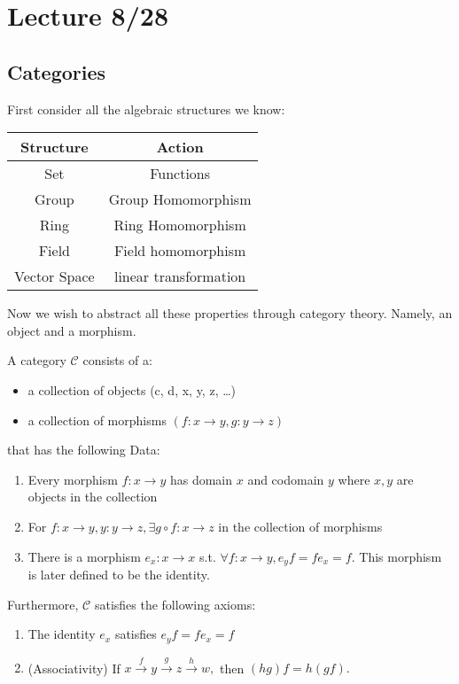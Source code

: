 \section{Lecture 8/28}
\subsection{Categories}
First consider all the algebraic structures we know:

\begin{center}
\begin{tabular}{c|c}
     Structure & Action \\\hline
     Set & Functions \\\hline
     Group & Group Homomorphism \\\hline
     Ring & Ring Homomorphism \\\hline
     Field & Field homomorphism \\\hline
     Vector Space & linear transformation \\
\end{tabular}
\end{center}

Now we wish to abstract all these properties through category theory. Namely, an object and a morphism. 

\begin{definition}
    A category $\mathcal{C}$ consists of a:
    \begin{itemize}
        \item a collection of objects (c, d, x, y, z, \dots)
        \item a collection of morphisms $(f: x\to y, g: y \to z) $
    \end{itemize}
    that has the following Data:
    \begin{enumerate} [label = D\arabic*\textrangle]
        \item Every morphism $f: x\to y$ has domain $x$ and codomain $y$ where $x,y$ are objects in the collection 
        \item For $f: x\to y, y: y\to z, \exists g \circ f: x \to z$ in the collection of morphisms 
        \item There is a morphism $e_x: x\to x$ s.t. $\forall f: x \to y, e_y f = f e_x = f.$ This morphism is later defined to be the identity.
    \end{enumerate}
     
    Furthermore, $\mathcal{C}$ satisfies the following axioms:
    \begin{enumerate} [label = A\arabic*\textrangle]
        \item The identity $e_x$ satisfies $e_y f = f e_x = f$
        \item (Associativity) If $x \xrightarrow{f} y \xrightarrow{g} z \xrightarrow{h}w,$ then $(hg)f = h(gf).$
    \end{enumerate}
\end{definition}

